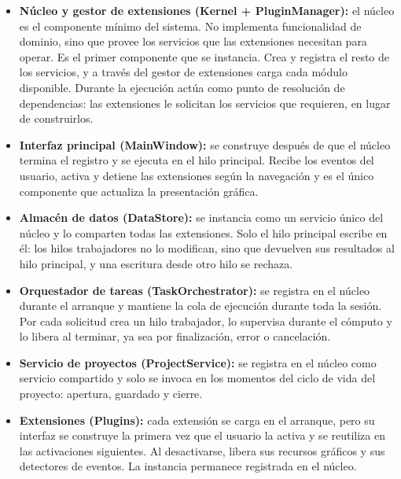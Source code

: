 \documentclass[11pt,a4paper]{article}
\DeclareRobustCommand{\_}{\textunderscore\allowbreak}
\begin{document}
\begin{itemize}
    \item \textbf{Núcleo y gestor de extensiones (Kernel + PluginManager):} el núcleo 
    es el componente mínimo del sistema. No implementa funcionalidad de dominio, sino 
    que provee los servicios que las extensiones necesitan para operar. Es el primer 
    componente que se instancia. Crea y registra el resto de los servicios, y a través 
    del gestor de extensiones carga cada módulo disponible. Durante la ejecución actúa 
    como punto de resolución de dependencias: las extensiones le solicitan los 
    servicios que requieren, en lugar de construirlos.

    \item \textbf{Interfaz principal (MainWindow):} se construye después de que el 
    núcleo termina el registro y se ejecuta en el hilo principal. Recibe los eventos 
    del usuario, activa y detiene las extensiones según la navegación y es el único 
    componente que actualiza la presentación gráfica.

    \item \textbf{Almacén de datos (DataStore):} se instancia como un servicio único 
    del núcleo y lo comparten todas las extensiones. Solo el hilo principal
    escribe en él: los hilos trabajadores no lo modifican, sino que devuelven sus
    resultados al hilo principal, y una escritura desde otro hilo se rechaza.

    \item \textbf{Orquestador de tareas (TaskOrchestrator):} se registra en el núcleo 
    durante el arranque y mantiene la cola de ejecución durante toda la sesión. Por 
    cada solicitud crea un hilo trabajador, lo supervisa durante el cómputo y lo libera 
    al terminar, ya sea por finalización, error o cancelación.

    \item \textbf{Servicio de proyectos (ProjectService):} se registra en el núcleo 
    como servicio compartido y solo se invoca en los momentos del ciclo de vida del 
    proyecto: apertura, guardado y cierre.

    \item \textbf{Extensiones (Plugins):} cada extensión se carga en el arranque, pero 
    su interfaz se construye la primera vez que el usuario la activa y se reutiliza en 
    las activaciones siguientes. Al desactivarse, libera sus recursos gráficos y sus 
    detectores de eventos. La instancia permanece registrada en el núcleo.
\end{itemize}
\end{document}
